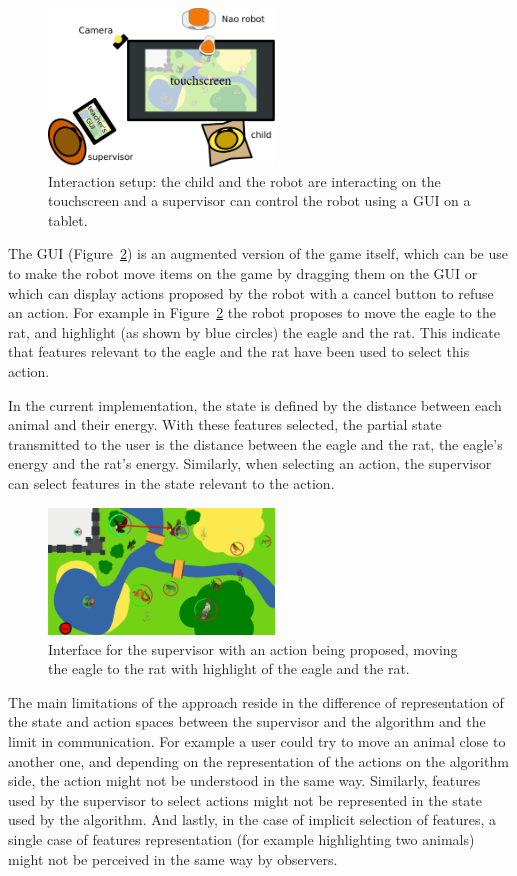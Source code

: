 \documentclass[letterpaper]{article} %
\begin{document}
\begin{figure}
        \centering
  \includegraphics[width=60mm]{./figs/setup} 
    \caption{Interaction setup: the child and the robot are interacting on the
    touchscreen and a supervisor can control the robot using a GUI on a tablet.}
        \label{fig:setup}
\end{figure}


The GUI (Figure~\ref{fig:gui}) is an augmented version of the game itself, which
can be use to make the robot move items on the game by dragging them on the GUI
or which can display actions proposed by the robot with a cancel button to
refuse an action. For example in Figure~\ref{fig:gui} the robot proposes to move
the eagle to the rat, and highlight (as shown by blue circles) the eagle and the
rat. This indicate that features relevant to the eagle and the rat have been
used to select this action.

In the current implementation, the state is defined by the distance between each
animal and their energy. With these features selected, the partial state
transmitted to the user is the distance between the eagle and the rat, the
eagle's energy and
the rat's energy. Similarly, when selecting an action, the supervisor can 
select features in the state relevant to the action.

\begin{figure}
        \centering
    \includegraphics[width=60mm]{./figs/proposition.png}
    \caption{Interface for the supervisor with an action being proposed, moving
        the eagle to the rat with highlight of the eagle and the rat.}
        \label{fig:gui}
\end{figure}


The main limitations of the approach reside in the difference of
representation of the state and action spaces between the supervisor and the
algorithm and the limit in communication. For example a user could try to move
an animal close to another one,
and depending on the representation of the actions on the algorithm side, the
action might not be understood in the same way. Similarly, features used by the
supervisor to select actions might not be represented in the state used by the
algorithm. And lastly, in the case of implicit selection of features, a single
case of features representation (for example highlighting two animals) might not
be perceived in the same way by observers.
\end{document}
